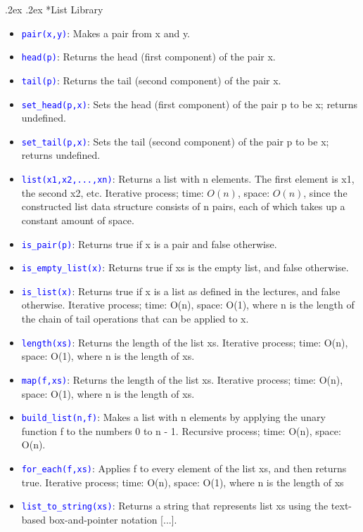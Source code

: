 \documentclass[10pt,portrait,a4paper]{article}
\makeatletter
\newcommand\codeblue[1]{\textcolor{blue}{\code{#1}}}
\def\code#1{\texttt{#1}}
\renewcommand{\subsection}{\@startsection{subsection}{1}{0mm}%
                                {.2ex}%
                                {.2ex}%
                                {\sffamily\bfseries}}
\makeatother
\begin{document}
\begin{multicols*}{4}
  \subsection*{List Library}
  \begin{itemize}
    \item \codeblue{pair(x,y)}: Makes a pair from x and y.
    \item \codeblue{head(p)}: Returns the head (first component) of the pair x.
    \item \codeblue{tail(p)}: Returns the tail (second component) of the pair x.
    \item \codeblue{set\_head(p,x)}: Sets the head (first component) of the pair p to be x; returns undefined.
    \item \codeblue{set\_tail(p,x)}: Sets the tail (second component) of the pair p to be x; returns undefined.
    \item \codeblue{list(x1,x2,...,xn)}: Returns a list with n elements. The first element is x1, the second x2, etc. Iterative process; time: $O(n)$, space: $O(n)$, since the constructed list data structure consists of n pairs, each of which takes up a constant amount of space.
    \item \codeblue{is\_pair(p)}: Returns true if x is a pair and false otherwise.
    \item \codeblue{is\_empty\_list(x)}: Returns true if xs is the empty list, and false otherwise.
    \item \codeblue{is\_list(x)}: Returns true if x is a list as defined in the lectures, and false otherwise. Iterative process; time: O(n), space: O(1), where n is the length of the chain of tail operations that can be applied to x.
    \item \codeblue{length(xs)}: Returns the length of the list xs. Iterative process; time: O(n), space: O(1), where n is the length of xs.
    \item \codeblue{map(f,xs)}: Returns the length of the list xs. Iterative process; time: O(n), space: O(1), where n is the length of xs.
    \item \codeblue{build\_list(n,f)}: Makes a list with n elements by applying the unary function f to the numbers 0 to n - 1. Recursive process; time: O(n), space: O(n).
    \item \codeblue{for\_each(f,xs)}: Applies f to every element of the list xs, and then returns true. Iterative process; time: O(n), space: O(1), where n is the length of xs
    \item \codeblue{list\_to\_string(xs)}: Returns a string that represents list xs using the text-based box-and-pointer notation [...].

\end{itemize}
\end{multicols*}
\end{document}
